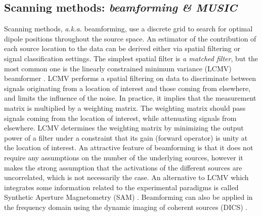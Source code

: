 \subsection{Scanning methods: \textit{beamforming \& MUSIC}}
Scanning methods, \textit{a.k.a.} beamforming, use a discrete grid to search for optimal dipole positions throughout the source space. An estimator of the contribution of each source location to the data can be derived either via spatial filtering or signal classification settings. The simplest spatial filter is \textit{a matched filter}, but the most common one is the linearly constrained minimum variance (LCMV) beamformer \cite{van1997localization}.
LCMV performs a spatial filtering on data to discriminate between signals originating from a location of interest and those coming from elsewhere, and limits the influence of the noise. In practice, it implies that the measurement matrix is multiplied by a weighting matrix. The weighting matrix should pass signals coming from the location of interest, while attenuating signals from elsewhere. LCMV determines the weighting matrix by minimizing the output power of a filter under a constraint that its gain (forward operator) is unity at the location of interest. An attractive feature of beamforming is that it does not require any assumptions on the number of the underlying sources, however it makes the strong assumption that the activations of the different sources are uncorrelated, which is not necessarily the case. An alternative to LCMV which integrates some information related to the experimental paradigms is called Synthetic Aperture Magnetometry (SAM) \cite{vrba2001signal}. Beamforming can also be applied in the frequency domain using the dynamic imaging of coherent sources (DICS) \cite{gross2001dynamic}.

